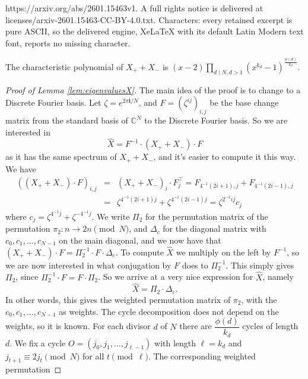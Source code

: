 \documentclass[10pt,a4paper]{amsart}
\newcommand{\C}{\mathbb{C}}
\newcommand{\ii}{\mathbf{i}}
\begin{document}
https://arxiv.org/abs/2601.15463v1. A full rights notice is delivered at licenses/arxiv-2601.15463-CC-BY-4.0.txt. Characters: every retained excerpt is pure ASCII, so the delivered engine, XeLaTeX with its default Latin Modern text font, reports no missing character.
\begin{lemma} \label{lem:eigenvaluesX}
    The characteristic polynomial of $ X_+ + X_- $ is
    $ (x-2) \displaystyle\prod_{d \mid N, d > 1} \left(x^{k_d}-1\right)^{\frac{\phi(d)}{k_d}} $.
\end{lemma}

\begin{proof}[Proof of Lemma \ref{lem:eigenvaluesX}]
    The main idea of the proof is to change to a Discrete Fourier basis. Let $ \zeta = e^{2 \pi \ii / N} $,
    and $ F = \left( \zeta^{ij} \right) _{i,j} $ be the base change matrix from the standard basis of $ \C^N $
    to the Discrete Fourier basis. So we are interested in
    \[ \hat{X} = F^{-1} \cdot (X_+ + X_-) \cdot F \]
    as it has the same spectrum of $ X_+ + X_- $, and it's easier to compute it this way. We have
    \begin{eqnarray*} \left((X_+ + X_-) \cdot F \right)_{i,j}
        & = & (X_+ + X_-)_i \cdot F^{\top}_j = F_{4^{-1}(2i+1),j} + F_{4^{-1}(2i-1),j} \\
        & = & \zeta^{4^{-1}(2i+1)j} + \zeta^{4^{-1}(2i-1)j} = \zeta^{2^{-1}ij} c_j
    \end{eqnarray*}
    where $ c_j = \zeta^{4^{-1}j} + \zeta^{-4^{-1}j} $. We write $ \Pi_2 $ for the permutation matrix of the
    permutation $ \pi_2: n \to 2 n \pmod{N} $, and $ \Delta_c $ for the diagonal matrix with
    $ c_0, c_1, \ldots, c_{N-1} $ on the main diagonal, and we now have that
    $ (X_+ + X_-) \cdot F = \Pi_2^{-1} \cdot F \cdot \Delta_c $. To compute $ \hat{X} $ we multiply on the left
    by $ F^{-1}  $, so we are now interested in what conjugation by $ F $ does to $ \Pi_2^{-1} $. This simply
    gives $ \Pi_2 $, since $ \Pi_2^{-1} \cdot F = F \cdot \Pi_2 $. So we arrive at a very nice expression for
    $ \hat{X} $, namely
    \[ \hat{X} = \Pi_2 \cdot \Delta_c . \]
    In other words, this gives the weighted permutation matrix of $ \pi_2 $, with the
    $ c_0, c_1, \ldots, c_{N-1} $ as weights. The cycle decomposition does not depend on the weights, so it
    is known. For each divisor $ d $ of $ N $ there are $ \dfrac{\phi(d)}{k_d} $ cycles of length $ d $. We
    fix a cycle $ O = (j_0, j_1, \ldots, j_{\ell-1}) $ with length $ \ell = k_d $ and
    $ j_{t+1} \equiv 2 j_t \pmod{N} $ for all $ t \pmod{\ell} $. The corresponding weighted permutation

\end{proof}
\end{document}
